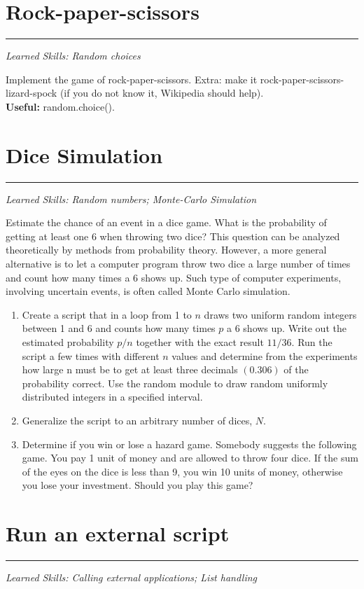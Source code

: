 \documentclass[smallheadings,12pt]{scrartcl}
\newcommand{\skills}[1]{\rule{1cm}{0pt}{\begin{minipage}{.8\textwidth}\small\em
      Learned Skills:  #1\end{minipage}}}
\begin{document}
\section{Rock-paper-scissors}
\skills{Random choices}

Implement the game of rock-paper-scissors.
Extra: make it {rock-paper-scissors-lizard-spock} (if you do not know it, Wikipedia should help).\\[2pt]
\textbf{Useful:} random.choice().

\section{Dice Simulation}
\skills{Random numbers; Monte-Carlo Simulation}

Estimate the chance of an event in a dice game.  What is the
probability of getting at least one 6 when throwing two dice?  This
question can be analyzed theoretically by methods from probability
theory. However, a more general alternative is to let a computer
program throw two dice a large number of times and count how many
times a 6 shows up. Such type of computer experiments, involving
uncertain events, is often called Monte Carlo simulation. 

\begin{enumerate}
\item Create a script that in a loop from 1 to $n$ draws two uniform
  random integers between 1 and 6 and counts how many times $p$ a 6
  shows up. Write out the estimated probability $p/n$ together with
  the exact result $11/36$.  Run the script a few times with different
  $n$ values and determine from the experiments how large n must be to
  get at least three decimals $(0.306)$ of the probability
  correct.  Use the random module to draw random uniformly distributed
  integers in a specified interval.
\item Generalize the script to an arbitrary number of dices, $N$.
\item Determine if you win or lose a hazard game.  Somebody suggests
  the following game. You pay 1 unit of money and are allowed to throw
  four dice. If the sum of the eyes on the dice is less than 9, you
  win 10 units of money, otherwise you lose your investment. Should
  you play this game?
\end{enumerate}

\section{Run an external script}
\skills{Calling external applications; List handling}
\end{document}
